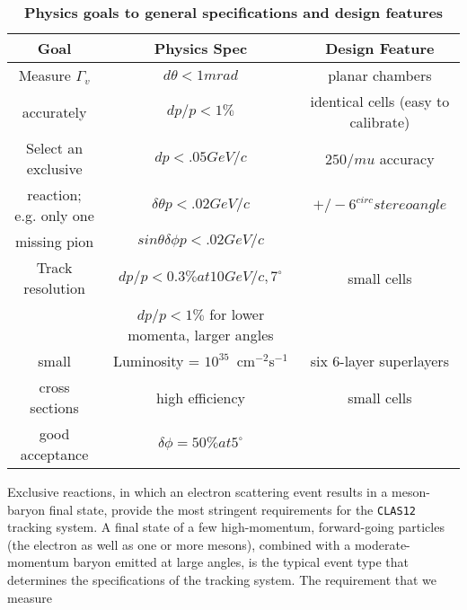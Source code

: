 \small{
\begin{table}[ht]
\begin{center}
\begin{tabular}{||c|c|c||} \hline \hline
   {\bf Goal}         & {\bf Physics Spec} & {\bf Design Feature}\\ \hline
Measure $\Gamma_v$  & $d \theta < 1mrad$   & planar chambers \\ 
accurately  & $dp/p < 1\% $ & identical cells (easy to calibrate)  \\ \hline
Select an exclusive  & $dp < .05 GeV/c$ & $250 /mu $ accuracy      \\ 
reaction; e.g. only one    & $\delta\theta p < .02 GeV/c$ &  $+/- 6^{circ} stereo angle $ \\ 
missing pion       & $sin\theta \delta \phi p < .02 GeV/c$ & \\ \hline
Track resolution       & $dp/p < 0.3\% at 10 GeV/c, 7^\circ$ & small cells \\ 
           & $dp/p < 1\%$ for lower momenta, larger angles &  \\ \hline
small       & Luminosity = $10^{35}$~cm$^{-2}$s$^{-1}$  & six 6-layer superlayers \\ 
cross sections  & high efficiency & small cells \\ \hline
good acceptance   & $\delta\phi = 50\% at 5^\circ$ & \\ \hline
\end{tabular}
\caption{\small{\bf Physics goals to general specifications and design features}}
\label{fwd-dc-physics-specifications}
\end{center}
\end{table}
}

Exclusive reactions, in which an electron scattering event 
results in a meson-baryon final state, provide the most 
stringent requirements for the {\tt CLAS12} tracking system. 
A final state 
of a few high-momentum, forward-going particles (the electron as well as one 
or more mesons), combined with a moderate-momentum baryon emitted at large 
angles, is the typical event type that determines the specifications of the 
tracking system.  The requirement that we measure

